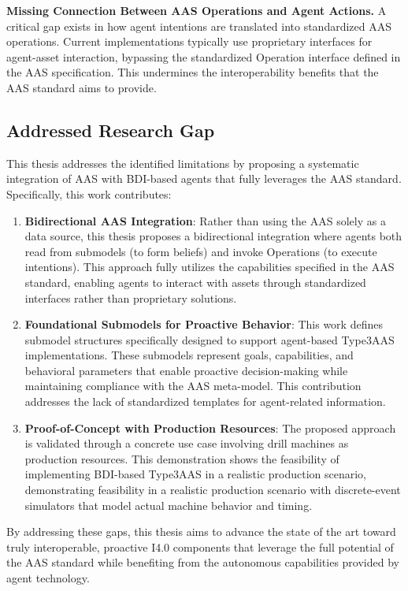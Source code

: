 \textbf{Missing Connection Between AAS Operations and Agent Actions.} A critical gap exists in how agent intentions are translated into standardized \ac{AAS} operations. Current implementations typically use proprietary interfaces for agent-asset interaction, bypassing the standardized Operation interface defined in the \ac{AAS} specification. This undermines the interoperability benefits that the \ac{AAS} standard aims to provide.

\subsection{Addressed Research Gap}

This thesis addresses the identified limitations by proposing a systematic integration of \ac{AAS} with \ac{BDI}-based agents that fully leverages the \ac{AAS} standard. Specifically, this work contributes:

\begin{enumerate}
    \item \textbf{Bidirectional AAS Integration}: Rather than using the \ac{AAS} solely as a data source, this thesis proposes a bidirectional integration where agents both read from submodels (to form beliefs) and invoke Operations (to execute intentions). This approach fully utilizes the capabilities specified in the \ac{AAS} standard, enabling agents to interact with assets through standardized interfaces rather than proprietary solutions.
    
    \item \textbf{Foundational Submodels for Proactive Behavior}: This work defines submodel structures specifically designed to support agent-based \ac{Type3AAS} implementations. These submodels represent goals, capabilities, and behavioral parameters that enable proactive decision-making while maintaining compliance with the \ac{AAS} meta-model. This contribution addresses the lack of standardized templates for agent-related information.
    
    \item \textbf{Proof-of-Concept with Production Resources}: The proposed approach is validated through a concrete use case involving drill machines as production resources. This demonstration shows the feasibility of implementing \ac{BDI}-based \ac{Type3AAS} in a realistic production scenario, demonstrating feasibility in a realistic production scenario with discrete-event simulators that model actual machine behavior and timing.
\end{enumerate}

By addressing these gaps, this thesis aims to advance the state of the art toward truly interoperable, proactive I4.0 components that leverage the full potential of the \ac{AAS} standard while benefiting from the autonomous capabilities provided by agent technology.
